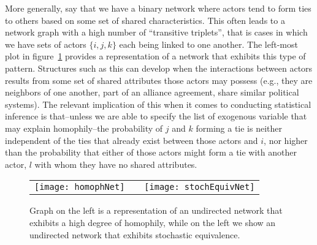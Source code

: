 More generally, say that we have a binary network where actors tend to form ties to others based on some set of shared characteristics. This often leads to a network graph with a high number of ``transitive triplets'', that is cases in which we have sets of actors $\{i,j,k\}$ each being linked to one another. The left-most plot in figure~\ref{fig:homphStochEquivNet} provides a representation of a network that exhibits this type of pattern. Structures such as this can develop when the interactions between actors results from some set of shared attributes those actors may possess (e.g., they are neighbors of one another, part of an alliance agreement, share similar political systems). The relevant implication of this when it comes to conducting statistical inference is that--unless we are able to specify the list of exogenous variable that may explain homophily--the probability of $j$ and $k$ forming a tie is neither independent of the ties that already exist between those actors and $i$, nor higher than the probability that either of those actors might form a tie with another actor, $l$ with whom they have no shared attributes. 

\begin{figure}[ht]
	\centering
	\begin{tabular}{lcr}
	\texttt{[image: homophNet]} & \hspace{2cm} &
	\texttt{[image: stochEquivNet]}	
	\end{tabular}
	\caption{Graph on the left is a representation of an undirected network that exhibits a high degree of homophily, while on the left we show an undirected network that exhibits stochastic equivalence. }
	\label{fig:homphStochEquivNet}
\end{figure}

